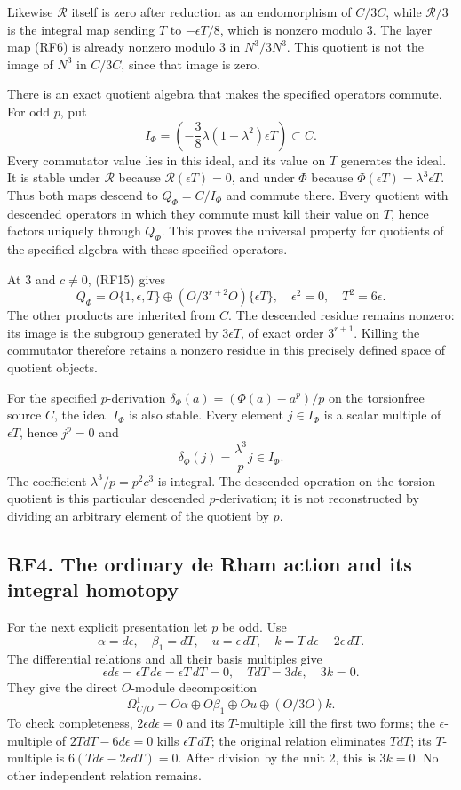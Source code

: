 \documentclass[
  10pt,
]{article}
\begin{document}
Likewise \(\mathcal R\) itself is zero after reduction as an
endomorphism of \(C/3C\), while \(\mathcal R/3\) is the integral map
sending \(T\) to \(-\epsilon T/8\), which is nonzero modulo 3. The layer
map (RF6) is already nonzero modulo 3 in \(N^3/3N^3\). This quotient is
not the image of \(N^3\) in \(C/3C\), since that image is zero.

There is an exact quotient algebra that makes the specified operators
commute. For odd \(p\), put \[
I_\Phi=\left(-\frac38\lambda(1-\lambda^2)\epsilon T\right)\subset C.
\tag{RF17}
\] Every commutator value lies in this ideal, and its value on \(T\)
generates the ideal. It is stable under \(\mathcal R\) because
\(\mathcal R(\epsilon T)=0\), and under \(\Phi\) because
\(\Phi(\epsilon T)=\lambda^3\epsilon T\). Thus both maps descend to
\(Q_\Phi=C/I_\Phi\) and commute there. Every quotient with descended
operators in which they commute must kill their value on \(T\), hence
factors uniquely through \(Q_\Phi\). This proves the universal property
for quotients of the specified algebra with these specified operators.

At 3 and \(c\ne0\), (RF15) gives \[
Q_\Phi=
O\{1,\epsilon,T\}\oplus(O/3^{r+2}O)\{\epsilon T\},
\quad \epsilon^2=0,\quad T^2=6\epsilon.
\tag{RF18}
\] The other products are inherited from \(C\). The descended residue
remains nonzero: its image is the subgroup generated by \(3\epsilon T\),
of exact order \(3^{r+1}\). Killing the commutator therefore retains a
nonzero residue in this precisely defined space of quotient objects.

For the specified \(p\)-derivation \(\delta_\Phi(a)=(\Phi(a)-a^p)/p\) on
the torsionfree source \(C\), the ideal \(I_\Phi\) is also stable. Every
element \(j\in I_\Phi\) is a scalar multiple of \(\epsilon T\), hence
\(j^p=0\) and \[
\delta_\Phi(j)=\frac{\lambda^3}{p}j\in I_\Phi.
\] The coefficient \(\lambda^3/p=p^2c^3\) is integral. The descended
operation on the torsion quotient is this particular descended
\(p\)-derivation; it is not reconstructed by dividing an arbitrary
element of the quotient by \(p\).

\subsection{RF4. The ordinary de Rham action and its integral
homotopy}\label{rf4.-the-ordinary-de-rham-action-and-its-integral-homotopy}

For the next explicit presentation let \(p\) be odd. Use \[
\alpha=d\epsilon,\quad \beta_1=dT,\quad
u=\epsilon\,dT,\quad
k=T\,d\epsilon-2\epsilon\,dT.
\] The differential relations and all their basis multiples give \[
\epsilon d\epsilon=\epsilon T\,d\epsilon=\epsilon T\,dT=0,
\quad TdT=3d\epsilon,\quad3k=0.
\] They give the direct \(O\)-module decomposition \[
\Omega^1_{C/O}=O\alpha\oplus O\beta_1\oplus Ou\oplus(O/3O)k.
\tag{RF19}
\] To check completeness, \(2\epsilon d\epsilon=0\) and its
\(T\)-multiple kill the first two forms; the \(\epsilon\)-multiple of
\(2TdT-6d\epsilon=0\) kills \(\epsilon T\,dT\); the original relation
eliminates \(TdT\); its \(T\)-multiple is
\(6(Td\epsilon-2\epsilon dT)=0\). After division by the unit 2, this is
\(3k=0\). No other independent relation remains.
\end{document}
